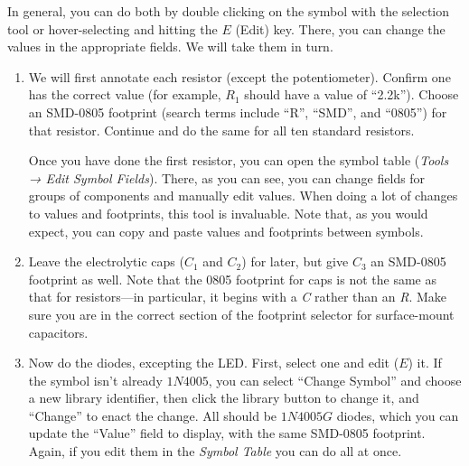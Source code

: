 \documentclass[
  letterpaper,
  DIV=11,
  numbers=noendperiod,
  oneside]{scrartcl}
\begin{document}
In general, you can do both by double clicking on the symbol with the
selection tool or hover-selecting and hitting the \(E\) (Edit) key.
There, you can change the values in the appropriate fields. We will take
them in turn.

\begin{enumerate}
\def\labelenumi{\arabic{enumi}.}
\item
  We will first annotate each resistor (except the potentiometer).
  Confirm one has the correct value (for example, \(R_1\) should have a
  value of ``2.2k''). Choose an SMD-0805 footprint (search terms include ``R'',
  ``SMD'', and ``0805'') for that resistor. Continue and do the same for
  all ten standard resistors.

  \begin{tcolorbox}[enhanced jigsaw, opacityback=0, left=2mm, rightrule=.15mm, breakable, arc=.35mm, opacitybacktitle=0.6, colbacktitle=quarto-callout-tip-color!10!white, bottomrule=.15mm, toprule=.15mm, colback=white, colframe=quarto-callout-tip-color-frame, leftrule=.75mm, bottomtitle=1mm, toptitle=1mm, titlerule=0mm, title=\textcolor{quarto-callout-tip-color}{\faLightbulb}\hspace{0.5em}{Tip}, coltitle=black]

  Once you have done the first resistor, you can open the symbol table
  (\emph{Tools → Edit Symbol Fields}). There, as you can see, you can
  change fields for groups of components and manually edit values. When
  doing a lot of changes to values and footprints, this tool is
  invaluable. Note that, as you would expect, you can copy and paste
  values and footprints between symbols.

  \end{tcolorbox}
\item
  Leave the electrolytic caps (\(C_1\) and \(C_2\)) for later, but give
  \(C_3\) an SMD-0805 footprint as well. Note that the 0805 footprint
  for caps is not the same as that for resistors---in particular, it
  begins with a \emph{C} rather than an \emph{R}. Make sure you are in
  the correct section of the footprint selector for surface-mount
  capacitors.
\item
  Now do the diodes, excepting the LED. First, select one and edit
  (\(E\)) it. If the symbol isn't already \(1N4005\), you can select
  ``Change Symbol'' and choose a new library identifier, then click the
  library button to change it, and ``Change'' to enact the change. All
  should be \(1N4005G\) diodes, which you can update the ``Value'' field
  to display, with the same SMD-0805 footprint. Again, if you edit them
  in the \emph{Symbol Table} you can do all at once.


\end{enumerate}
\end{document}
